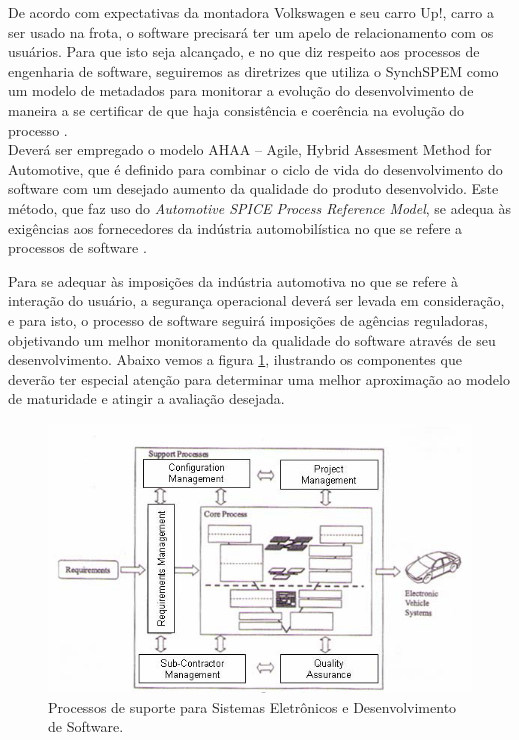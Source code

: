 \documentclass[12pt]{article}
\begin{document}
De acordo com expectativas da montadora Volkswagen e seu carro Up!, carro a ser usado na frota, o software precisará ter um apelo de relacionamento com os usuários. Para que isto seja alcançado, e no que diz respeito aos processos de engenharia de software, seguiremos as diretrizes que utiliza o SynchSPEM como um modelo de metadados para monitorar a evolução do desenvolvimento de maneira a se certificar de que haja consistência e coerência na evolução do processo \cite{Rochd2014}. 
\\
Deverá ser empregado o modelo AHAA – Agile, Hybrid Assesment Method for Automotive, que é definido para combinar o ciclo de vida do desenvolvimento do software com um desejado aumento da qualidade do produto desenvolvido. Este método, que faz uso do \textit{Automotive SPICE Process Reference Model}, se adequa às exigências aos fornecedores da indústria automobilística no que se refere a processos de software \cite{McCaffery2008}. 

Para se adequar às imposições da indústria automotiva no que se refere à interação do usuário, a segurança operacional deverá ser levada em consideração, e para isto, o processo de software seguirá imposições de agências reguladoras, objetivando um melhor monitoramento da qualidade do software através de seu desenvolvimento. Abaixo vemos a figura \ref{fig:exampleFig4}, ilustrando os componentes que deverão ter especial atenção para determinar uma melhor aproximação ao modelo de maturidade e atingir a avaliação desejada.

\begin{figure}[ht]
\centering
\includegraphics[scale=.7] {swebok_engenharia.png}
\caption{Processos de suporte para Sistemas Eletrônicos e Desenvolvimento de Software.}
\label{fig:exampleFig4}
\end{figure}
\end{document}
